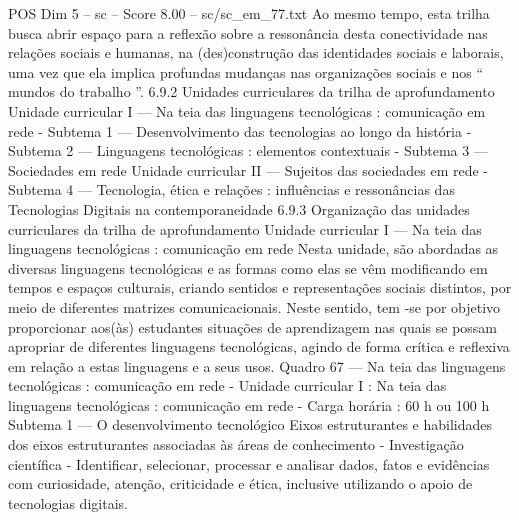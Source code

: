 \begin{textsample}{POS Dim 5 – sc – Score 8.00 – sc/sc\_em\_77.txt}
Ao mesmo tempo, esta trilha busca abrir espaço para a reflexão sobre a ressonância desta conectividade nas relações sociais e humanas, na (des)construção das identidades sociais e laborais, uma vez que ela implica profundas mudanças nas organizações sociais e nos “ mundos do trabalho ”. 6.9.2 Unidades curriculares da trilha de aprofundamento Unidade curricular I — Na teia das linguagens tecnológicas : comunicação em rede - Subtema 1 — Desenvolvimento das tecnologias ao longo da história - Subtema 2 — Linguagens tecnológicas : elementos contextuais - Subtema 3 — Sociedades em rede Unidade curricular II — Sujeitos das sociedades em rede - Subtema 4 — Tecnologia, ética e relações : influências e ressonâncias das Tecnologias Digitais na contemporaneidade 6.9.3 Organização das unidades curriculares da trilha de aprofundamento Unidade curricular I — Na teia das linguagens tecnológicas : comunicação em rede Nesta unidade, são abordadas as diversas linguagens tecnológicas e as formas como elas se vêm modificando em tempos e espaços culturais, criando sentidos e representações sociais distintos, por meio de diferentes matrizes comunicacionais.
Neste sentido, tem -se por objetivo proporcionar aos(às) estudantes situações de aprendizagem nas quais se possam apropriar de diferentes linguagens tecnológicas, agindo de forma crítica e reflexiva em relação a estas linguagens e a seus usos.
Quadro 67 — Na teia das linguagens tecnológicas : comunicação em rede - Unidade curricular I : Na teia das linguagens tecnológicas : comunicação em rede - Carga horária : 60 h ou 100 h Subtema 1 — O desenvolvimento tecnológico Eixos estruturantes e habilidades dos eixos estruturantes associadas às áreas de conhecimento - Investigação científica - Identificar, selecionar, processar e analisar dados, fatos e evidências com curiosidade, atenção, criticidade e ética, inclusive utilizando o apoio de tecnologias digitais.

\end{textsample}
